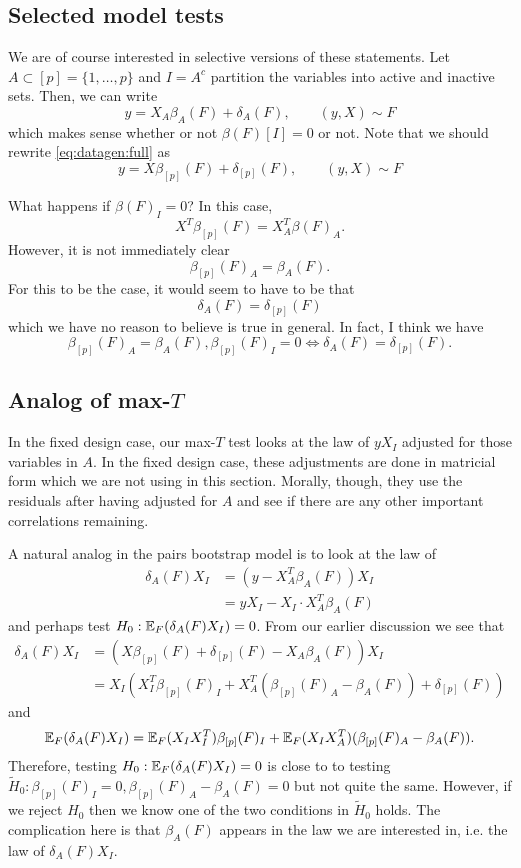 \documentclass{article}
\begin{document}
\subsection{Selected model tests}

We are of course interested in selective versions of these statements.
Let $A \subset [p]=\{1, \dots, p\}$ and $I=A^c$ partition
the variables into active and inactive sets.
Then, we can write
\begin{equation}
\label{eq:datagen}
y = X_A\beta_A(F) +\delta_A(F), \qquad (y, X) \sim F
\end{equation}
which makes sense whether or not $\beta(F)[I]=0$ or not. Note that
we should rewrite \eqref{eq:datagen:full} as
\begin{equation}
\label{eq:datagen}
y = X\beta_{[p]}(F) +\delta_{[p]}(F), \qquad (y, X) \sim F
\end{equation}


What happens if $\beta(F)_I=0$? In this case,
$$
X^T\beta_{[p]}(F) = X_A^T\beta(F)_A.
$$
However, it is not immediately clear 
$$
\beta_{[p]}(F)_A=\beta_A(F).
$$
For this to be the case, it would seem to have to be that
$$
\delta_A(F)=\delta_{[p]}(F)
$$
which we have no reason to believe is true in general. In fact, I think
we have
$$
\beta_{[p]}(F)_A = \beta_A(F), \beta_{[p]}(F)_I=0 \iff \delta_A(F)=\delta_{[p]}(F).
$$

\subsection{Analog of max-$T$}

In the fixed design case, our max-$T$ test looks at the law of
$yX_I$ adjusted for those variables in $A$. In the
fixed design case, these adjustments are done
in matricial form which we are not using in this section.
Morally, though, they use the residuals after having adjusted for $A$
and see if there are any other important correlations remaining.

A natural analog
in the pairs bootstrap model is to look at the law of
$$
\begin{aligned}
\delta_A(F) X_I &= (y-X_A^T\beta_A(F)) X_I \\
&= yX_I - X_I \cdot X_A^T\beta_A(F)
\end{aligned}
$$
and perhaps test $H_0:\mathbb{E}_F(\delta_A(F)X_I)=0$.
From our earlier discussion we see that
$$
\begin{aligned}
\delta_A(F)X_I &= (X\beta_{[p]}(F) + \delta_{[p]}(F) - X_A\beta_A(F))X_I \\
&= X_I(X_I^T\beta_{[p]}(F)_I + X_A^T(\beta_{[p]}(F)_A - \beta_A(F))  + \delta_{[p]}(F))
\end{aligned}
$$
and
$$
\mathbb{E}_F(\delta_A(F)X_I) = \mathbb{E}_F(X_IX_I^T)\beta_{[p]}(F)_I + \mathbb{E}_F(X_IX_A^T)(\beta_{[p]}(F)_A - \beta_A(F)).
$$
Therefore, testing $H_0:\mathbb{E}_F(\delta_A(F)X_I)=0$ is close to
to testing $\tilde{H}_0:\beta_{[p]}(F)_I=0, \beta_{[p]}(F)_A-\beta_A(F)=0$ but not
quite the same. However, if we reject $H_0$ then we know one of the
two conditions in $\tilde{H}_0$ holds.
The complication here is that $\beta_A(F)$ appears in the law
we are interested in, i.e. the law of $\delta_A(F)X_I$.  
\end{document}
